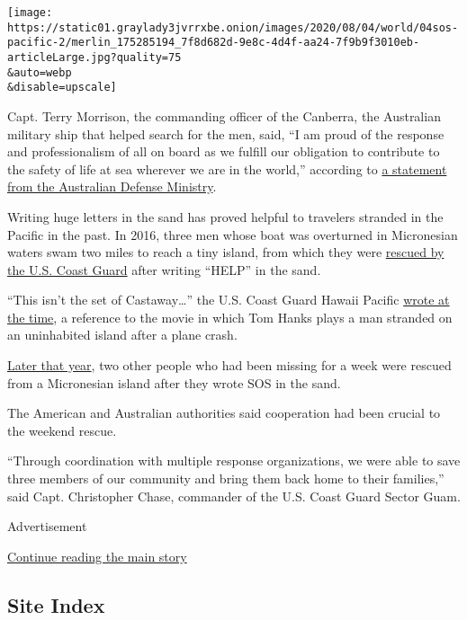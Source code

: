 \texttt{[image: https://static01.graylady3jvrrxbe.onion/images/2020/08/04/world/04sos-pacific-2/merlin\_175285194\_7f8d682d-9e8c-4d4f-aa24-7f9b9f3010eb-articleLarge.jpg?quality=75\\\&auto=webp\\\&disable=upscale]}

Capt. Terry Morrison, the commanding officer of the Canberra, the
Australian military ship that helped search for the men, said, ``I am
proud of the response and professionalism of all on board as we fulfill
our obligation to contribute to the safety of life at sea wherever we
are in the world,'' according to
\href{https://news.defence.gov.au/international/hmas-canberra-assists-search-and-rescue}{a
statement from the Australian Defense Ministry}.

Writing huge letters in the sand has proved helpful to travelers
stranded in the Pacific in the past. In 2016, three men whose boat was
overturned in Micronesian waters swam two miles to reach a tiny island,
from which they were
\href{https://twitter.com/USCGHawaiiPac/status/718703857837019137?ref_src=twsrc\%5Etfw\%7Ctwcamp\%5Etweetembed\%7Ctwterm\%5E718703857837019137\%7Ctwgr\%5E\&ref_url=https\%3A\%2F\%2Fwww.theguardian.com\%2Fus-news\%2F2016\%2Fapr\%2F09\%2Fmen-rescued-help-palm-leaves-island-pacific}{rescued
by the U.S. Coast Guard} after writing ``HELP'' in the sand.

``This isn't the set of Castaway\ldots'' the U.S. Coast Guard Hawaii
Pacific
\href{https://www.facebookcorewwwi.onion/USCG.Hawaii.Pacific/posts/986794331411733}{wrote
at the time}, a reference to the movie in which Tom Hanks plays a man
stranded on an uninhabited island after a plane crash.

\href{https://www.bbc.com/news/world-asia-37203796}{Later that year},
two other people who had been missing for a week were rescued from a
Micronesian island after they wrote SOS in the sand.

The American and Australian authorities said cooperation had been
crucial to the weekend rescue.

``Through coordination with multiple response organizations, we were
able to save three members of our community and bring them back home to
their families,'' said Capt. Christopher Chase, commander of the U.S.
Coast Guard Sector Guam.

Advertisement

\protect\hyperlink{after-bottom}{Continue reading the main story}

\hypertarget{site-index}{%
\subsection{Site Index}\label{site-index}}


